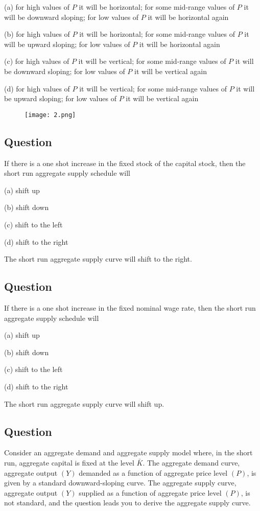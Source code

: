 (a) for high values of \(P\) it will be horizontal; for some mid-range values of \(P\) it will be downward sloping; for low values of \(P\) it will be horizontal again

(b) for high values of \(P\) it will be horizontal; for some mid-range values of \(P\) it will be upward sloping; for low values of \(P\) it will be horizontal again

(c) for high values of \(P\) it will be vertical; for some mid-range values of \(P\) it will be downward sloping; for low values of \(P\) it will be vertical again

(d) for high values of \(P\) it will be vertical; for some mid-range values of \(P\) it will be upward sloping; for low values of \(P\) it will be vertical again

\begin{figure}[H]
\centering
\texttt{[image: 2.png]}
\end{figure}

\subsection{Question}
If there is a one shot increase in the fixed stock of the capital stock, then the short run aggregate supply schedule will

(a) shift up

(b) shift down

(c) shift to the left

(d) shift to the right

The short run aggregate supply curve will shift to the right.

\subsection{Question}
If there is a one shot increase in the fixed nominal wage rate, then the short run aggregate supply schedule will

(a) shift up

(b) shift down

(c) shift to the left

(d) shift to the right

The short run aggregate supply curve will shift up.

\subsection{Question}

Consider an aggregate demand and aggregate supply model where, in the short run, aggregate capital is fixed at the level \(\bar{K}\). The aggregate demand curve, aggregate output \((Y)\) demanded as a function of aggregate price level \((P)\), is given by a standard downward-sloping curve. The aggregate supply curve, aggregate output \((Y)\) supplied as a function of aggregate price level \((P)\), is not standard, and the question leads you to derive the aggregate supply curve.

